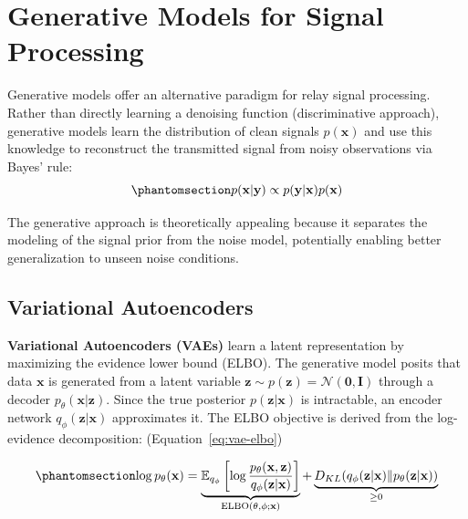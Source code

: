 \section{Generative Models for Signal Processing}\label{sec:generative-models-for-signal-processing}

Generative models offer an alternative paradigm for relay signal processing. Rather than directly learning a denoising function (discriminative approach), generative models learn the distribution of clean signals \(p(\mathbf{x})\) and use this knowledge to reconstruct the transmitted signal from noisy observations via Bayes' rule:
\begin{equation}\protect\phantomsection\label{eq:bayes-rule}{p(\mathbf{x} | \mathbf{y}) \propto p(\mathbf{y} | \mathbf{x}) p(\mathbf{x})}
\end{equation}

The generative approach is theoretically appealing because it separates the modeling of the signal prior from the noise model, potentially enabling better generalization to unseen noise conditions.

\subsection{Variational Autoencoders}\label{sec:variational-autoencoders}

\textbf{Variational Autoencoders (VAEs)} \cite{KingmaWelling2014VAE} learn a latent representation by maximizing the evidence lower bound (ELBO). The generative model posits that data \(\mathbf{x}\) is generated from a latent variable \(\mathbf{z} \sim p(\mathbf{z}) = \mathcal{N}(\mathbf{0}, \mathbf{I})\) through a decoder \(p_\theta(\mathbf{x} | \mathbf{z})\). Since the true posterior \(p(\mathbf{z} | \mathbf{x})\) is intractable, an encoder network \(q_\phi(\mathbf{z} | \mathbf{x})\) approximates it. The ELBO objective is derived from the log-evidence decomposition: (Equation~\ref{eq:vae-elbo})

\begin{equation}\protect\phantomsection\label{eq:vae-elbo}{\log p_\theta(\mathbf{x}) = \underbrace{\mathbb{E}_{q_\phi}\left[\log \frac{p_\theta(\mathbf{x}, \mathbf{z})}{q_\phi(\mathbf{z} | \mathbf{x})}\right]}_{\text{ELBO}(\theta, \phi; \mathbf{x})} + \underbrace{D_{KL}(q_\phi(\mathbf{z} | \mathbf{x}) \| p_\theta(\mathbf{z} | \mathbf{x}))}_{\geq 0}
}\end{equation}

